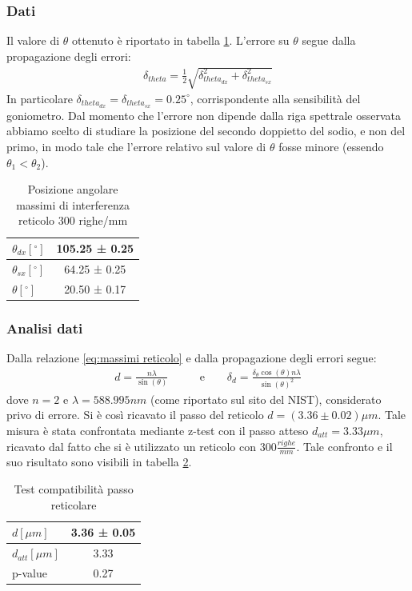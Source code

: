\documentclass[a4paper]{article}
\begin{document}
\subsubsection{Dati}
Il valore di $\theta$ ottenuto è riportato in tabella \ref{tab:angoli_d}. L'errore su $\theta$ segue dalla propagazione degli errori:
\begin{align}
\delta_{theta} = \frac{1}{2}\sqrt{\delta_{theta_{dx}}^2+\delta_{theta_{sx}}^2}
\label{eq:err_angolo}
\end{align}
In particolare $\delta_{theta_{dx}} =\delta_{theta_{sx}}= 0.25^\circ$, corrispondente alla sensibilità del goniometro.
Dal momento che l'errore non dipende dalla riga spettrale osservata abbiamo scelto di studiare la posizione del secondo doppietto del sodio, e non del primo, in modo tale che l'errore relativo sul valore di $\theta$ fosse minore (essendo $\theta_1 < \theta_2$).

\begin{table}[htbp]
\centering
\begin{tabular}{|l|c|}
\hline
$\theta_{dx} [^\circ]$ & 105.25 ± 0.25 \\\hline
$\theta_{sx} [^\circ]$ & 64.25 ± 0.25 \\\hline
$\theta [^\circ]$ & 20.50 ± 0.17  \\\hline
\end{tabular}
\caption{Posizione angolare massimi di interferenza reticolo 300 righe/mm}
\label{tab:angoli_d}
\end{table}

\subsubsection{Analisi dati}
Dalla relazione \ref{eq:massimi reticolo} e dalla propagazione degli errori segue:
\begin{align}
    d = \frac{n\lambda}{\sin(\theta)}  \qquad & \text{e} \qquad \delta_d = \frac{\delta_{\theta}\cos(\theta)n\lambda}{\sin(\theta)^2}
\label{eq:passo_reticolo}
\end{align}
dove $n=2$ e $\lambda=588.995 nm$ (come riportato sul sito del NIST), considerato privo di errore.
Si è così ricavato il passo del reticolo $d=(3.36 \pm0.02)\mu m$. Tale misura è stata confrontata mediante z-test con il passo atteso $d_{att}=3.33 \mu m$, ricavato dal fatto che si è utilizzato un reticolo con $300 \frac{righe}{mm}$. 
Tale confronto e il suo risultato sono visibili in tabella \ref{tab:passo_reticolo+compatibilità}.

\begin{table}[htbp]
\centering
\begin{tabular}{|l|c|}
\hline
$d[\mu m]$ & 3.36 ± 0.05 \\\hline
$d_{att} [\mu m]$ & 3.33 \\\hline
p-value &  0.27 \\\hline
\end{tabular}
\caption{Test compatibilità passo reticolare}
\label{tab:passo_reticolo+compatibilità}
\end{table}
\end{document}
